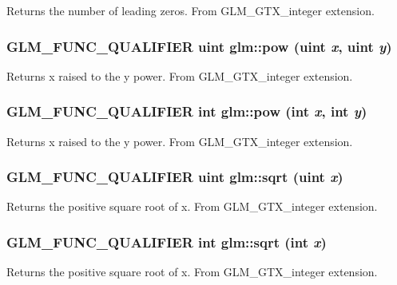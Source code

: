 Returns the number of leading zeros. From GLM\_\-GTX\_\-integer extension. \hypertarget{group__gtx__integer_ga8229e850c3cc4ad83492fe390ada044}{
\subsubsection[pow]{\setlength{\rightskip}{0pt plus 5cm}GLM\_\-FUNC\_\-QUALIFIER uint glm::pow (uint {\em x}, \/  uint {\em y})}}
\label{group__gtx__integer_ga8229e850c3cc4ad83492fe390ada044}


Returns x raised to the y power. From GLM\_\-GTX\_\-integer extension. \hypertarget{group__gtx__integer_g9642514a44a67afa70966d756f040ca9}{
\subsubsection[pow]{\setlength{\rightskip}{0pt plus 5cm}GLM\_\-FUNC\_\-QUALIFIER int glm::pow (int {\em x}, \/  int {\em y})}}
\label{group__gtx__integer_g9642514a44a67afa70966d756f040ca9}


Returns x raised to the y power. From GLM\_\-GTX\_\-integer extension. \hypertarget{group__gtx__integer_g457e9efca8339bf918d319e9c55f7c8f}{
\subsubsection[sqrt]{\setlength{\rightskip}{0pt plus 5cm}GLM\_\-FUNC\_\-QUALIFIER uint glm::sqrt (uint {\em x})}}
\label{group__gtx__integer_g457e9efca8339bf918d319e9c55f7c8f}


Returns the positive square root of x. From GLM\_\-GTX\_\-integer extension. \hypertarget{group__gtx__integer_g78e2e68330e91d350fcfc2f4831cad12}{
\subsubsection[sqrt]{\setlength{\rightskip}{0pt plus 5cm}GLM\_\-FUNC\_\-QUALIFIER int glm::sqrt (int {\em x})}}
\label{group__gtx__integer_g78e2e68330e91d350fcfc2f4831cad12}


Returns the positive square root of x. From GLM\_\-GTX\_\-integer extension. 